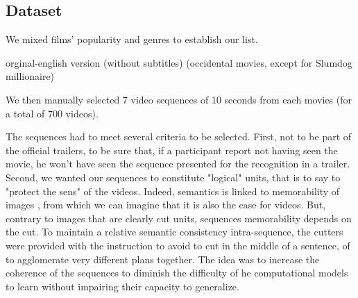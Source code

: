 \documentclass[sigconf]{acmart}
\begin{document}
\subsection{Dataset}
We mixed films' popularity and genres to establish our list. 


orginal-english version (without subtitles) (occidental movies, except for Slumdog millionaire) %

We then manually selected 7 video sequences of 10 seconds from each movies (for a total of 700 videos).


The sequences had to meet several criteria to be selected.
First, not to be part of the official trailers, to be sure that, if a participant report not having seen the movie, he won't have seen the sequence presented for the recognition in a trailer.
Second, we wanted our sequences to constitute "logical" units, that is to say to "protect the sens" of the videos. Indeed, semantics is linked to memorability of images \cite{isola_2014_makes}, from which we can imagine that it is also the case for videos. But, contrary to images that are clearly cut units, sequences memorability depends on the cut. To maintain a relative semantic consistency intra-sequence, the cutters were provided with the instruction to avoid to cut in the middle of a sentence, of to agglomerate very different plans together. The idea was to increase the coherence of the sequences to diminish the difficulty of he computational models to learn without impairing their capacity to generalize.
\end{document}
